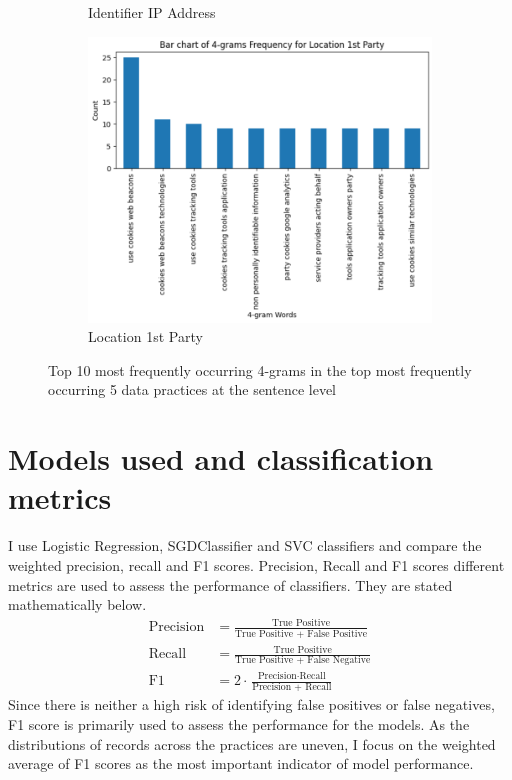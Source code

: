 \begin{figure}[!ht]
\begin{subfigure}[t]{.5\textwidth}
	  \caption{Identifier IP Address}
	\end{subfigure}
	\begin{subfigure}[t]{.5\textwidth}
		\centering
		\includegraphics[width=\linewidth]{figures/4_grams_location.png}
		\caption{Location 1st Party}
	\end{subfigure}
	\caption{Top 10 most frequently occurring 4-grams in the top most frequently occurring 5 data practices at the sentence level}
	\label{fig:4_grams_sentence}
  \end{figure}


\section{Models used and classification metrics}
I use Logistic Regression, SGDClassifier and SVC classifiers and compare the weighted precision, recall and F1 scores. Precision, Recall and F1 scores different metrics are used to assess the performance of classifiers. They are stated mathematically below.
\begin{align*}
	\text{Precision} &= \frac{\text{True Positive}}{\text{True Positive + False Positive}} \\
	\text{Recall} &= \frac{\text{True Positive}}{\text{True Positive + False Negative}} \\
	\text{F1} &= 2 \cdot \frac{\text{Precision} \cdot \text{Recall}}{\text{Precision + Recall}}
\end{align*}
Since there is neither a high risk of identifying false positives or false negatives, F1 score is primarily used to assess the performance for the models. As the distributions of records across the practices are uneven, I focus on the weighted average of F1 scores as the most important indicator of model performance. 

